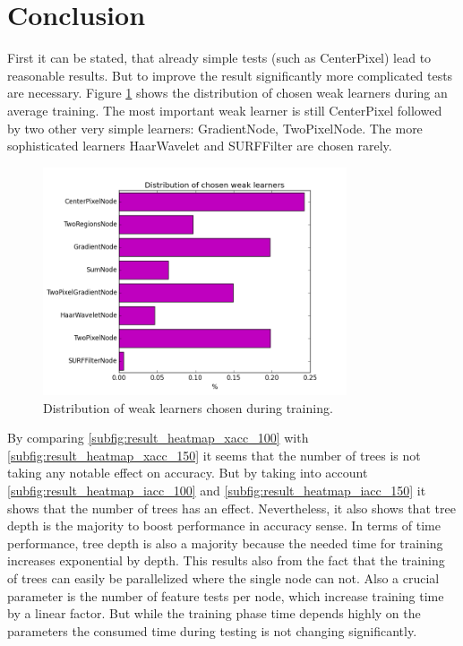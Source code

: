 \section{Conclusion}
\label{sec:conclusion}

First it can be stated, that already simple tests (such as CenterPixel) lead to reasonable results. But to improve the result significantly more complicated tests are necessary. Figure \ref{fig:learner_dist} shows the distribution of chosen weak learners during an average training. The most important weak learner is still CenterPixel
followed by two other very simple learners: GradientNode, TwoPixelNode. The more sophisticated learners HaarWavelet and SURFFilter are chosen rarely.

\begin{figure}
	\centering
	\includegraphics[width=0.8\textwidth]{plots/weak_learner_distribution.png}
	\caption{Distribution of weak learners chosen during training.}
	\label{fig:learner_dist}
\end{figure}

By comparing \ref{subfig:result_heatmap_xacc_100} with \ref{subfig:result_heatmap_xacc_150} it seems that the number of trees is not taking any notable effect on accuracy. But by taking into account \ref{subfig:result_heatmap_iacc_100} and \ref{subfig:result_heatmap_iacc_150} it shows that the number of trees has an effect. Nevertheless, it also shows that tree depth is the majority to boost performance in accuracy sense. In terms of time performance, tree depth is also a majority because the needed time for training increases exponential by depth. This results also from the fact that the training of trees can easily be parallelized where the single node can not. Also a crucial parameter is the number of feature tests per node, which increase training time by a linear factor. But while the training phase time depends highly on the parameters the consumed time during testing is not changing significantly.


